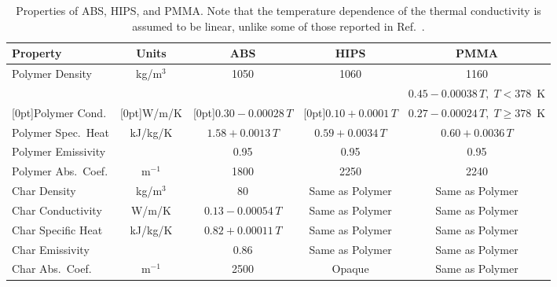 \begin{table}[h!]
\caption[Properties of ABS, HIPS, and PMMA]{Properties of ABS, HIPS, and PMMA. Note that the temperature dependence of the thermal conductivity is assumed to be linear, unlike some of those reported in Ref.~\cite{Li:Thesis}.}
\centering
\begin{tabular*}{\textwidth}{|l|@{\extracolsep\fill}c@{\extracolsep\fill}|c|c|c|}
\hline
Property                    & Units         & ABS                     & HIPS                    & PMMA                     \\ \hline \hline
Polymer Density             & kg/m$^3$      & 1050                    & 1060                    & 1160                     \\ \hline
                            &               &                         &                         & $0.45-0.00038 \, T, \; T<378$~K      \\
\raisebox{1.5ex}[0pt]{Polymer Cond.}        & \raisebox{1.5ex}[0pt]{W/m/K}         & \raisebox{1.5ex}[0pt]{$0.30-0.00028 \, T$}  & \raisebox{1.5ex}[0pt]{$0.10+0.0001  \, T$} & $0.27-0.00024 \, T, \; T\ge 378$~K  \\ \hline
Polymer Spec.~Heat          & kJ/kg/K       & $1.58+0.0013  \, T$     & $0.59+0.0034  \, T$     & $0.60+0.0036  \, T$      \\ \hline
Polymer Emissivity          &               & 0.95                    & 0.95                    & 0.95                     \\ \hline
Polymer Abs.~Coef.          & m$^{-1}$      & 1800                    & 2250                    & 2240                     \\ \hline
Char Density                & kg/m$^3$      & 80                      & Same as Polymer         & Same as Polymer          \\ \hline
Char Conductivity           & W/m/K         & $0.13-0.00054 \, T$     & Same as Polymer         & Same as Polymer          \\ \hline
Char Specific Heat          & kJ/kg/K       & $0.82+0.00011 \, T$     & Same as Polymer         & Same as Polymer          \\ \hline
Char Emissivity             &               & 0.86                    & Same as Polymer         & Same as Polymer          \\ \hline
Char Abs.~Coef.             & m$^{-1}$      & 2500                    & Opaque                  & Same as Polymer          \\ \hline

\end{tabular*}
\end{table}
